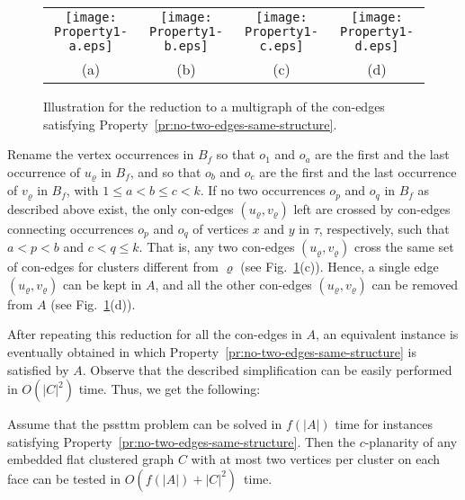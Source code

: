 \documentclass[letter,runningheads]{llncs}
\begin{document}
\begin{figure}[tb]
\begin{center}
\begin{tabular}{c c c c}
\mbox{\texttt{[image: Property1-a.eps]}} \hspace{2mm} &
\mbox{\texttt{[image: Property1-b.eps]}}  \hspace{2mm} &
\mbox{\texttt{[image: Property1-c.eps]}}  \hspace{2mm} &
\mbox{\texttt{[image: Property1-d.eps]}}\\
(a) \hspace{2mm} & (b) \hspace{2mm} & (c) \hspace{2mm} & (d)
\end{tabular}
\caption{Illustration for the reduction to a multigraph of the con-edges satisfying Property~\ref{pr:no-two-edges-same-structure}.}
\label{fig:property1}
\end{center}
\end{figure}

Rename the vertex occurrences in $B_f$ so that $o_1$ and $o_a$ are the first and the last occurrence of $u_{\varrho}$ in $B_f$, and so that $o_b$ and $o_c$ are the first and the last occurrence of $v_{\varrho}$ in $B_f$, with $1\leq a < b\leq c < k$. If no two occurrences $o_p$ and $o_q$ in $B_f$ as described above exist, the only con-edges $(u_{\varrho},v_{\varrho})$ left are crossed by con-edges connecting occurrences $o_p$ and $o_q$ of vertices $x$ and $y$ in $\tau$, respectively, such that $a<p<b$ and $c<q\leq k$. That is, any two con-edges $(u_{\varrho},v_{\varrho})$ cross the same set of con-edges for clusters different from $\varrho$ (see Fig.~\ref{fig:property1}(c)). Hence, a single edge $(u_{\varrho},v_{\varrho})$ can be kept in $A$, and all the other con-edges $(u_{\varrho},v_{\varrho})$ can be removed from $A$ (see Fig.~\ref{fig:property1}(d)).

After repeating this reduction for all the con-edges in $A$, an equivalent instance is eventually obtained in which Property~\ref{pr:no-two-edges-same-structure} is satisfied by $A$. Observe that the described simplification can be easily performed in $O(|C|^2)$ time. Thus, we get the following:

\begin{lemma} \label{le:pssttm}
Assume that the {\sc pssttm} problem can be solved in $f(|A|)$ time for instances satisfying Property~\ref{pr:no-two-edges-same-structure}. Then the $c$-planarity of any embedded flat clustered graph $C$ with at most two vertices per cluster on each face can be tested in $O(f(|A|)+|C|^2)$~time.
\end{lemma}
\end{document}
